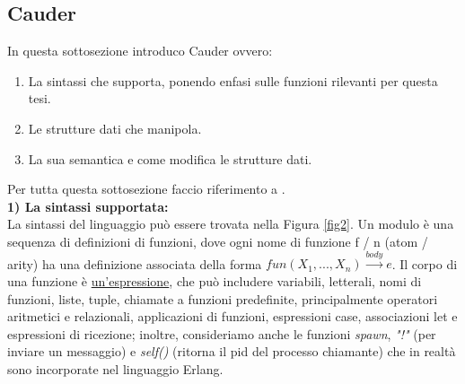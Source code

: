\documentclass[background.tex]{subfiles}
\begin{document}
\subsection{Cauder}
In questa sottosezione introduco Cauder ovvero: 
	\begin{enumerate}
		\item La sintassi che supporta, ponendo enfasi sulle funzioni rilevanti per questa tesi.
		\item Le strutture dati che manipola.
		\item La sua semantica e come modifica le strutture dati.
	\end{enumerate}
Per tutta questa sottosezione faccio riferimento a \cite{lanese19}.\\
\textbf{1) La sintassi supportata:}\\
La sintassi del linguaggio può essere trovata nella Figura \ref{fig2}. Un modulo è una sequenza di definizioni di funzioni, dove ogni nome di funzione f / n (atom / arity) ha una definizione associata della forma $\displaystyle fun (X_{1},..., X_{n}) \xrightarrow{body} e$.
Il corpo di una funzione è \underline{un'espressione}, che può includere variabili, letterali, nomi di funzioni, liste, tuple, chiamate a funzioni predefinite, principalmente operatori aritmetici e relazionali, applicazioni di funzioni, espressioni case, associazioni let e espressioni di ricezione; inoltre, consideriamo anche le funzioni \textit{spawn}, \textit{"!"} (per inviare un messaggio) e \textit{self()} (ritorna il pid del processo chiamante) che in realtà sono incorporate nel linguaggio Erlang.
\end{document}

